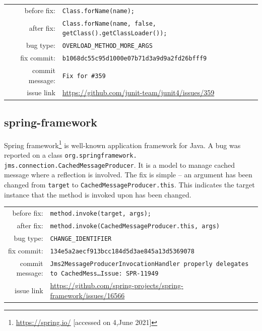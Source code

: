 \documentclass[sigconf,review,anonymous]{acmart}
\begin{document}
\begin{table}[h!]
  \footnotesize
  \label{tab:junit4}
  \begin{tabular}{rp{5cm}}
    before fix:  &  \footnotesize{\texttt{Class.forName(name);}}\\
    after fix:  &  \footnotesize{\texttt{Class.forName(name, false, getClass().getClassLoader());}} \\
    bug type:   &  \texttt{OVERLOAD\_METHOD\_MORE\_ARGS} \\
    fix commit: &  \texttt{b1068dc55c95d1000e07b71d3a9d9a2fd26bfff9} \\
    commit message:   &  \texttt{Fix for \#359}\\
    issue link &  \url{https://github.com/junit-team/junit4/issues/359}
  \end{tabular}
\end{table}


\subsection{spring-framework}

Spring framework\footnote{\url{https://spring.io/} [accessed on 4,June 2021]} is well-known application framework for Java. A bug was reported on a class \texttt{org.springframework.\\jms.connection.CachedMessageProducer}. It is a model to manage cached message where a reflection is involved. The fix is simple -- an argument has been changed from \texttt{target} to \texttt{CachedMessageProducer.this}. This indicates the target instance that the method is invoked upon has been changed.
\begin{table}[h!]
  \footnotesize
  \label{tab:spring}
  \begin{tabular}{rp{5cm}}
    before fix:  &  \footnotesize{\texttt{method.invoke(target, args);}} \\
    after fix:  &  \footnotesize{\texttt{method.invoke(CachedMessageProducer.this, args)}} \\
    bug type:   &  \texttt{CHANGE\_IDENTIFIER} \\
    fix commit: &  \texttt{134e5a2aecf913bcc184d5d3ae845a13d5369078} \\
    commit message:   &  \texttt{Jms2MessageProducerInvocationHandler properly delegates to CachedMess…Issue: SPR-11949}\\
    issue link &  \url{https://github.com/spring-projects/spring-framework/issues/16566}
  \end{tabular}
\end{table}
\end{document}
